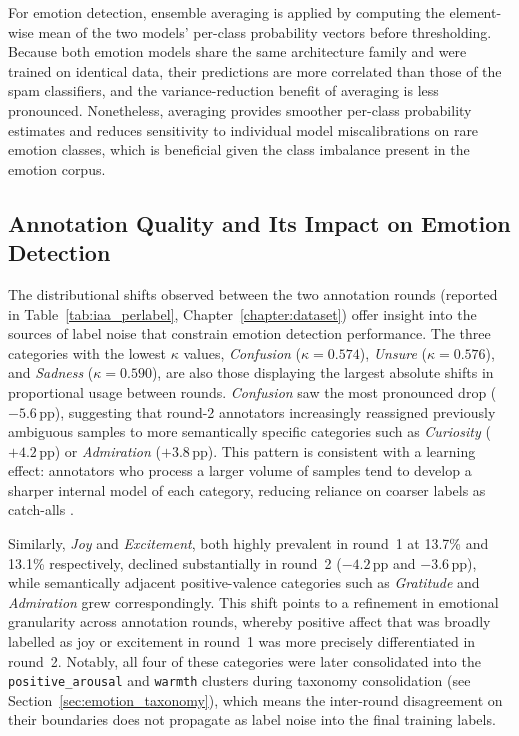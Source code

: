 For emotion detection, ensemble averaging is applied by computing the element-wise mean of the two models' per-class probability vectors before thresholding. Because both emotion models share the same architecture family and were trained on identical data, their predictions are more correlated than those of the spam classifiers, and the variance-reduction benefit of averaging is less pronounced. Nonetheless, averaging provides smoother per-class probability estimates and reduces sensitivity to individual model miscalibrations on rare emotion classes, which is beneficial given the class imbalance present in the emotion corpus.

\subsection{Annotation Quality and Its Impact on Emotion Detection}
\label{sec:iaa_discussion}

The distributional shifts observed between the two annotation rounds (reported in
Table~\ref{tab:iaa_perlabel}, Chapter~\ref{chapter:dataset}) offer insight into the sources
of label noise that constrain emotion detection performance. The three categories with the
lowest $\kappa$ values, \textit{Confusion} ($\kappa = 0.574$), \textit{Unsure}
($\kappa = 0.576$), and \textit{Sadness} ($\kappa = 0.590$), are also those displaying
the largest absolute shifts in proportional usage between rounds. \textit{Confusion} saw the
most pronounced drop ($-5.6$\,pp), suggesting that round-2 annotators increasingly
reassigned previously ambiguous samples to more semantically specific categories such as
\textit{Curiosity} ($+4.2$\,pp) or \textit{Admiration} ($+3.8$\,pp). This pattern is
consistent with a learning effect: annotators who process a larger volume of samples tend to
develop a sharper internal model of each category, reducing reliance on coarser labels as
catch-alls \cite{aroyo2015truth}.

Similarly, \textit{Joy} and \textit{Excitement}, both highly prevalent in round~1 at
13.7\% and 13.1\% respectively, declined substantially in round~2 ($-4.2$\,pp and
$-3.6$\,pp), while semantically adjacent positive-valence categories such as
\textit{Gratitude} and \textit{Admiration} grew correspondingly. This shift points to a
refinement in emotional granularity across annotation rounds, whereby positive affect that
was broadly labelled as joy or excitement in round~1 was more precisely differentiated in
round~2. Notably, all four of these categories were later consolidated into the
\texttt{positive\_arousal} and \texttt{warmth} clusters during taxonomy consolidation
(see Section~\ref{sec:emotion_taxonomy}), which means the inter-round disagreement on their
boundaries does not propagate as label noise into the final training labels.

